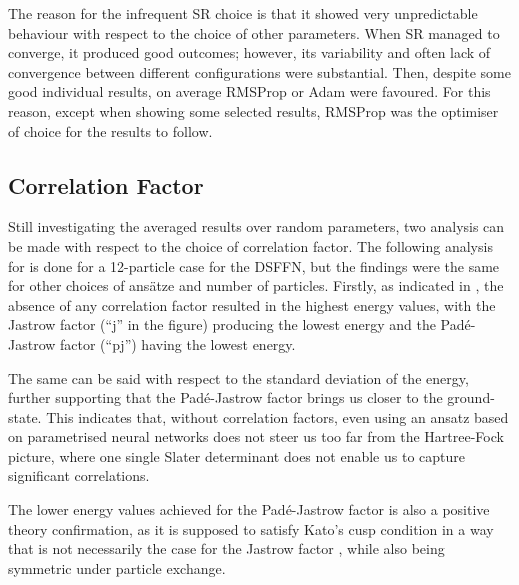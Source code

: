 The reason for the infrequent SR choice is that it showed very unpredictable behaviour with respect to the choice of other parameters. When SR managed to converge, it produced good outcomes; however, its variability and often lack of convergence between different configurations were substantial. Then, despite some good individual results, on average RMSProp or Adam were favoured. For this reason, except when showing some selected results, RMSProp was the optimiser of choice for the results to follow.


\subsection{Correlation Factor}

Still investigating the averaged results over random parameters, two analysis can be made with respect to the choice of correlation factor. The following analysis for  is done for a 12-particle case for the DSFFN, but the findings were the same for other choices of ansätze and number of particles. Firstly, as indicated in , the absence of any correlation factor resulted in the highest energy values, with the Jastrow factor (``j'' in the figure) producing the lowest energy and the Padé-Jastrow factor (``pj'') having the lowest energy. 

The same can be said with respect to the standard deviation of the energy, further supporting that the Padé-Jastrow factor brings us closer to the ground-state. This indicates that, without correlation factors, even using an ansatz based on parametrised neural networks does not steer us too far from the Hartree-Fock picture, where one single Slater determinant does not enable us to capture significant correlations. 

The lower energy values achieved for the Padé-Jastrow factor is also a positive theory confirmation, as it is supposed to satisfy Kato's cusp condition in a way that is not necessarily the case for the Jastrow factor \cite{huang1998spin}, while also being symmetric under particle exchange.

